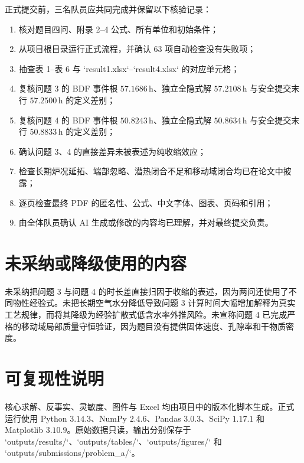 \documentclass[UTF8,a4paper,zihao=-4,fontset=fandol]{ctexart}
\begin{document}
正式提交前，三名队员应共同完成并保留以下核验记录：
\begin{enumerate}
  \item 核对题目四问、附录 2--4 公式、所有单位和初始条件；
  \item 从项目根目录运行正式流程，并确认 $63$ 项自动检查没有失败项；
  \item 抽查表 1--表 6 与 `result1.xlsx`--`result4.xlsx` 的对应单元格；
  \item 复核问题 3 的 BDF 事件根 $57.1686\,\mathrm{h}$、独立全隐式解 $57.2108\,\mathrm{h}$ 与安全提交末行 $57.2500\,\mathrm{h}$ 的定义差别；
  \item 复核问题 4 的 BDF 事件根 $50.8243\,\mathrm{h}$、独立全隐式解 $50.8634\,\mathrm{h}$ 与安全提交末行 $50.8833\,\mathrm{h}$ 的定义差别；
  \item 确认问题 3、4 的直接差异未被表述为纯收缩效应；
  \item 检查长期炉况延拓、端部忽略、潜热闭合不足和移动域闭合均已在论文中披露；
  \item 逐页检查最终 PDF 的匿名性、公式、中文字体、图表、页码和引用；
  \item 由全体队员确认 AI 生成或修改的内容均已理解，并对最终提交负责。
\end{enumerate}

\section{未采纳或降级使用的内容}

未采纳把问题 3 与问题 4 的时长差直接归因于收缩的表述，因为两问还使用了不同物性经验式。未把长期空气水分降低导致问题 3 计算时间大幅增加解释为真实工艺规律，而将其降级为经验扩散式低含水率外推风险。未宣称问题 4 已完成严格的移动域局部质量守恒验证，因为题目没有提供固体速度、孔隙率和干物质密度。

\section{可复现性说明}

核心求解、反事实、灵敏度、图件与 Excel 均由项目中的版本化脚本生成。正式运行使用 Python $3.14.3$、NumPy $2.4.6$、Pandas $3.0.3$、SciPy $1.17.1$ 和 Matplotlib $3.10.9$。原始数据只读，输出分别保存于 `outputs/results/`、`outputs/tables/`、`outputs/figures/` 和 `outputs/submissions/problem\_a/`。
\end{document}

